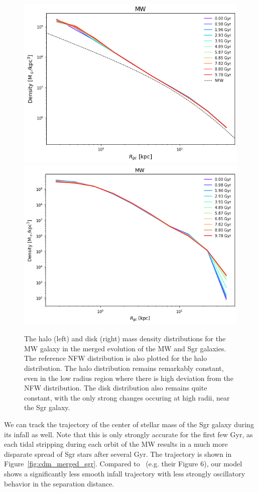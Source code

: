 \begin{figure}[h]
    \centering
    \includegraphics[width=0.45\linewidth]{fig/cdm/merged_mw_halo.png}
    \includegraphics[width=0.45\linewidth]{fig/cdm/merged_mw_disk.png}
    \caption{
        The halo (left) and disk (right) mass density distributions for the MW
        galaxy in the merged evolution of the MW and Sgr galaxies. The reference
        NFW distribution is also plotted for the halo distribution. The halo
        distribution remains remarkably constant, even in the low radius
        region where there is high deviation from the NFW distribution. The disk
        distribution also remains quite constant, with the only strong changes
        occuring at high radii, near the Sgr galaxy.
    }
    \label{fig:cdm_merged_mw}
\end{figure}

We can track the trajectory of the center of stellar mass of the Sgr galaxy
during its infall as well. Note that this is only strongly accurate for the
first few Gyr, as each tidal stripping during each orbit of the MW results in
a much more disparate spread of Sgr stars after several Gyr. The trajectory is
shown in Figure~\ref{fig:cdm_merged_sgr}. Compared
to~\cite{dierickx_predicted_2017} (e.g. their Figure 6), our model shows a
significantly less smooth infall trajectory with less strongly oscillatory
behavior in the separation distance. 

